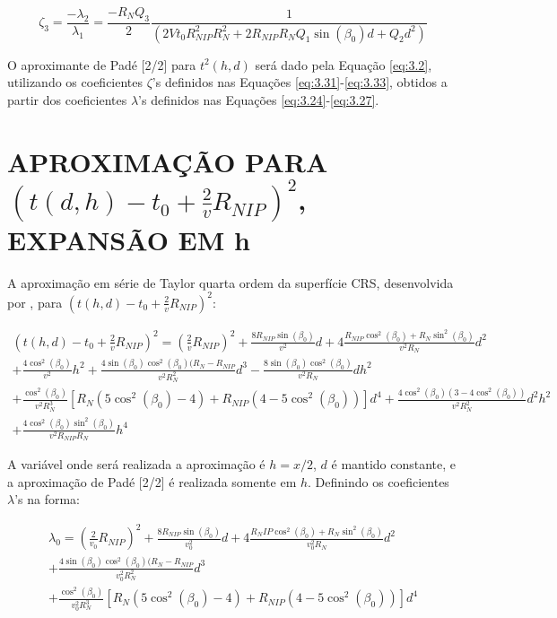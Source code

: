 \begin{equation}
\label{eq:6.33}
 \zeta_3=\frac{-\lambda_2}{\lambda_1}=\frac{-R_NQ_3}{2}\frac{1}{(2Vt_0R_{NIP}^2R_N^2+2R_{NIP}R_NQ_1\sin(\beta_0)d+Q_2d^2)} 
\end{equation}


O aproximante de Padé [2/2] para $t^2(h,d)$ será dado pela Equação \ref{eq:3.2},
utilizando os coeficientes $\zeta$'s definidos nas Equações \ref{eq:3.31}-\ref{eq:3.33}, 
obtidos a partir dos coeficientes 
$\lambda$'s definidos nas Equações \ref{eq:3.24}-\ref{eq:3.27}.


\section{APROXIMAÇÃO PARA $(t(d,h)-t_0+\frac{2}{v}R_{NIP})^2$, EXPANSÃO EM h}
\label{sec:6.3}
A aproximação em série de Taylor quarta ordem da superfície CRS, 
desenvolvida por \cite{germam}, para $(t(h,d)-t_0+\frac{2}{v}R_{NIP})^2$:

\begin{multline}
\label{eq:6.34}
(t(h,d)-t_0+\frac{2}{v}R_{NIP})^2=(\frac{2}{v}R_{NIP})^2+\frac{8R_{NIP}\sin(\beta_0)}{v^2}d+4\frac{R_{NIP}\cos^2(\beta_0)+R_N\sin^2(\beta_0)}{v^2R_N}d^2 \\
+\frac{4\cos^2(\beta_0)}{v^2}h^2+\frac{4\sin(\beta_0)\cos^2(\beta_0)(R_N-R_{NIP}}{v^2R_N^2}d^3-\frac{8\sin(\beta_0)\cos^2(\beta_0)}{v^2R_N}dh^2 \\
+\frac{\cos^2(\beta_0)}{v^2R_N^3}[R_N(5\cos^2(\beta_0)-4)+R_{NIP}(4-5\cos^2(\beta_0))]d^4+\frac{4\cos^2(\beta_0)(3-4\cos^2(\beta_0))}{v^2R_N^2}d^2h^2 \\
+\frac{4\cos^2(\beta_0)\sin^2(\beta_0)}{v^2R_{NIP}R_N}h^4
\end{multline}

A variável onde será realizada a aproximação é $h=x/2$,
$d$ é mantido constante, e a aproximação de Padé [2/2] é realizada somente em $h$.
Definindo os coeficientes $\lambda$'s na forma:

\begin{multline}
\label{eq:6.35}
 \lambda_0=(\frac{2}{v_0}R_{NIP})^2+\frac{8R_{NIP}\sin(\beta_0)}{v_0^2}d+4\frac{R_NIP\cos^2(\beta_0)+R_N\sin^2(\beta_0)}{v_0^2R_N}d^2 \\
 +\frac{4\sin(\beta_0)\cos^2(\beta_0)(R_N-R_{NIP}}{v_0^2R_N^2}d^3 \\
 +\frac{\cos^2(\beta_0)}{v_0^2R_N^3}[R_N(5\cos^2(\beta_0)-4)+R_{NIP}(4-5\cos^2(\beta_0))]d^4
 \end{multline}
 
